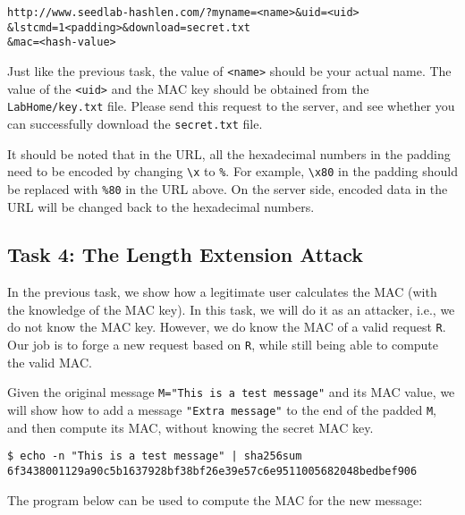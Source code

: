 \begin{lstlisting}
http://www.seedlab-hashlen.com/?myname=<name>&uid=<uid>
&lstcmd=1<padding>&download=secret.txt
&mac=<hash-value>
\end{lstlisting}

Just like the previous task, the value of \texttt{<name>} should be your actual name.
The value of the \texttt{<uid>} and the MAC key should be
obtained from the \texttt{LabHome/key.txt} file.
Please send this request to the server, and see whether you can
successfully download the \texttt{secret.txt} file.

It should be noted that in the URL,
all the hexadecimal numbers in the padding
need to be encoded by changing
\texttt{\textbackslash x} to \texttt{\%}. For example,
\texttt{\textbackslash x80} in the padding should be
replaced with \texttt{\%80} in the URL above.
On the server side, encoded data in the URL
will be changed back to the hexadecimal numbers.


\subsection{Task 4: The Length Extension Attack}


In the previous task, we show how a legitimate user calculates the MAC (with
the knowledge of the MAC key). In this task, we will do it as an attacker,
i.e., we do not know the MAC key. However, we do know the MAC of a valid
request \texttt{R}. Our job is to forge a new request based on \texttt{R},
while still being able to compute the valid MAC.

Given the original message \texttt{M="This is a test message"} and its
MAC value, we will show how to add a message
\texttt{"Extra message"} to the end of the padded \texttt{M}, and
then compute its MAC, without knowing the secret MAC key.

\begin{lstlisting}
$ echo -n "This is a test message" | sha256sum
6f3438001129a90c5b1637928bf38bf26e39e57c6e9511005682048bedbef906
\end{lstlisting}

The program below can be used to compute the MAC for the
new message:

